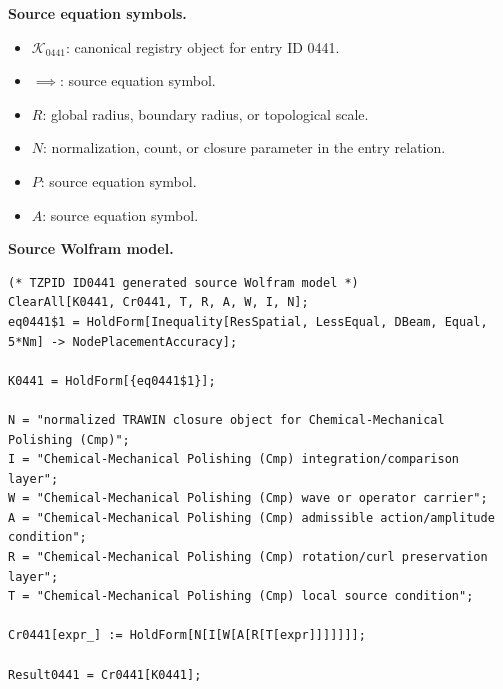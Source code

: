 \begin{minipage}[t]{0.49\linewidth}
\begingroup
\small
\raggedright
\textbf{Source equation symbols.}\par
\begin{itemize}[leftmargin=1.35em,itemsep=1pt,topsep=1pt,parsep=0pt]
    \item $\mathcal{K}_{0441}$: canonical registry object for entry ID 0441.
    \item $\implies$: source equation symbol.
    \item $R$: global radius, boundary radius, or topological scale.
    \item $N$: normalization, count, or closure parameter in the entry relation.
    \item $P$: source equation symbol.
    \item $A$: source equation symbol.
\end{itemize}
\endgroup
\end{minipage}\hfill
\begin{minipage}[t]{0.47\linewidth}
\begingroup
\scriptsize
\raggedright
\textbf{Source Wolfram model.}\par
\begin{Verbatim}[fontsize=\tiny,breaklines=true,breakanywhere=true]
(* TZPID ID0441 generated source Wolfram model *)
ClearAll[K0441, Cr0441, T, R, A, W, I, N];
eq0441$1 = HoldForm[Inequality[ResSpatial, LessEqual, DBeam, Equal, 5*Nm] -> NodePlacementAccuracy];

K0441 = HoldForm[{eq0441$1}];

N = "normalized TRAWIN closure object for Chemical-Mechanical Polishing (Cmp)";
I = "Chemical-Mechanical Polishing (Cmp) integration/comparison layer";
W = "Chemical-Mechanical Polishing (Cmp) wave or operator carrier";
A = "Chemical-Mechanical Polishing (Cmp) admissible action/amplitude condition";
R = "Chemical-Mechanical Polishing (Cmp) rotation/curl preservation layer";
T = "Chemical-Mechanical Polishing (Cmp) local source condition";

Cr0441[expr_] := HoldForm[N[I[W[A[R[T[expr]]]]]]];

Result0441 = Cr0441[K0441];
\end{Verbatim}
\endgroup
\end{minipage}

